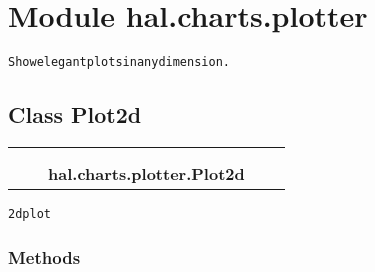 %
%
%


\section{Module hal.charts.plotter}

    \label{hal:charts:plotter}
\begin{alltt}
Show elegant plots in any dimension. 
\end{alltt}



\subsection{Class Plot2d}

    \label{hal:charts:plotter:Plot2d}
\begin{tabular}{cccccc}
\multicolumn{2}{r}{\settowidth{\BCL}{object}\multirow{2}{\BCL}{object}}
&&
  \\\cline{3-3}
  &&\multicolumn{1}{c|}{}
&&
  \\
&&\multicolumn{2}{l}{\textbf{hal.charts.plotter.Plot2d}}
\end{tabular}

\begin{alltt}
2d plot 
\end{alltt}



  \subsubsection{Methods}

